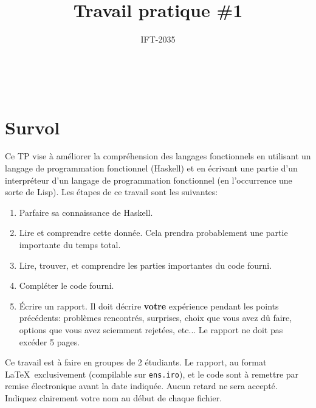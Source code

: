 \documentclass{article}
\title{Travail pratique \#1}
\author{IFT-2035}
\begin{document}
\maketitle

{\centering {} \\}

\newcommand \mML {\ensuremath\mu\textsl{ML}}
\newcommand \kw [1] {\textsf{#1}}
\newcommand \id [1] {\textsl{#1}}
\newcommand \punc [1] {\kw{`#1'}}
\newcommand \str [1] {\texttt{"#1"}}
\newenvironment{outitemize}{
  \begin{itemize}
  \let \origitem \item \def \item {\origitem[]\hspace{-18pt}}
}{
  \end{itemize}
}
\newcommand \MAlign [2][t] {
  \begin{array}[#1]{@{}l}
    #2
  \end{array}}

\section{Survol}

Ce TP vise à améliorer la compréhension des langages fonctionnels en
utilisant un langage de programmation fonctionnel (Haskell) et en écrivant
une partie d'un interpréteur d'un langage de programmation fonctionnel (en
l'occurrence une sorte de Lisp).  Les étapes de ce travail sont les suivantes:
\begin{enumerate}
\item Parfaire sa connaissance de Haskell.
\item Lire et comprendre cette donnée.  Cela prendra probablement une partie
  importante du temps total.
\item Lire, trouver, et comprendre les parties importantes du code fourni.
\item Compléter le code fourni.
\item Écrire un rapport.  Il doit décrire \textbf{votre} expérience pendant
  les points précédents: problèmes rencontrés, surprises, choix que vous
  avez dû faire, options que vous avez sciemment rejetées, etc...  Le
  rapport ne doit pas excéder 5 pages.
\end{enumerate}

Ce travail est à faire en groupes de 2 étudiants.  Le rapport, au format
\LaTeX\ exclusivement (compilable sur \texttt{ens.iro}), et le code sont
à remettre par remise électronique avant la date indiquée.  Aucun retard ne
sera accepté.  Indiquez clairement votre nom au début de chaque fichier.
\end{document}
